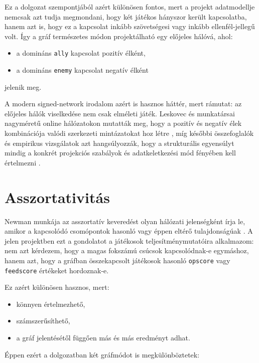 \documentclass[a4paper,12pt]{report}
\begin{document}
Ez a dolgozat szempontjából azért különösen fontos, mert a projekt adatmodellje nemcsak azt tudja megmondani, hogy két játékos hányszor került kapcsolatba, hanem azt is, hogy ez a kapcsolat inkább szövetségesi vagy inkább ellenfél-jellegű volt. Így a gráf természetes módon projektálható egy előjeles hálóvá, ahol:

\begin{itemize}
    \item a domináns \texttt{ally} kapcsolat pozitív élként,
    \item a domináns \texttt{enemy} kapcsolat negatív élként
\end{itemize}

jelenik meg.

A modern signed-network irodalom azért is hasznos háttér, mert rámutat: az előjeles hálók viselkedése nem csak elméleti játék. Leskovec és munkatársai nagyméretű online hálózatokon mutatták meg, hogy a pozitív és negatív élek kombinációja valódi szerkezeti mintázatokat hoz létre \cite{leskovec2010}, míg későbbi összefoglalók és empirikus vizsgálatok azt hangsúlyozzák, hogy a strukturális egyensúlyt mindig a konkrét projekciós szabályok és adatkeletkezési mód fényében kell értelmezni \cite{lerner2016,facchetti2011}.

\section{Asszortativitás}

Newman munkája az asszortatív keveredést olyan hálózati jelenségként írja le, amikor a kapcsolódó csomópontok hasonló vagy éppen eltérő tulajdonságúak \cite{newman2003}. A jelen projektben ezt a gondolatot a játékosok teljesítménymutatóira alkalmazom: nem azt kérdezem, hogy a magas fokszámú csúcsok kapcsolódnak-e egymáshoz, hanem azt, hogy a gráfban összekapcsolt játékosok hasonló \texttt{opscore} vagy \texttt{feedscore} értékeket hordoznak-e.

Ez azért különösen hasznos, mert:

\begin{itemize}
    \item könnyen értelmezhető,
    \item számszerűsíthető,
    \item a gráf jelentésétől függően más és más eredményt adhat.
\end{itemize}

Éppen ezért a dolgozatban két gráfmódot is megkülönböztetek:
\end{document}
